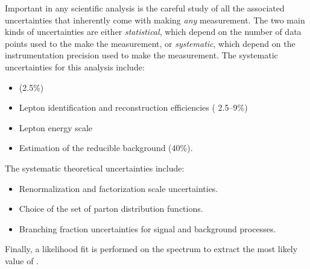 
Important in any scientific analysis is the careful study of all the associated uncertainties that inherently come with making \emph{any} measurement.
The two main kinds of uncertainties are either \emph{statistical}, which depend on the number of data points used to the make the measurement, or \emph{systematic}, which depend on the instrumentation precision used to make the measurement.
The systematic uncertainties for this analysis include:
\begin{itemize}
	\item \lumiint
	(2.5\%)
	\item Lepton identification and reconstruction efficiencies (
		2.5--9\%)
	\item Lepton energy scale
	\item Estimation of the reducible background (40\%).
\end{itemize}
The systematic theoretical uncertainties include:
\begin{itemize}
	\item Renormalization and factorization scale uncertainties.
	\item Choice of the set of parton distribution functions.
	\item Branching fraction uncertainties for signal and background processes.
\end{itemize}

Finally, a likelihood fit is performed on the \mH spectrum to extract the most likely value of \mH.




